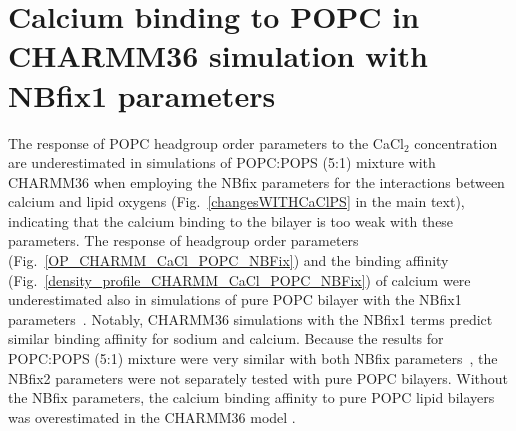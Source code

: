 \documentclass[journal=jpcbfk,manuscript=article]{achemso}
\begin{document}
\newpage

%

\clearpage
\section{Calcium binding to POPC in CHARMM36 simulation with NBfix1 parameters}\label{CHARMMcalciumNBfix}

The response of POPC headgroup order parameters to the CaCl$_2$ concentration
are underestimated in simulations of POPC:POPS (5:1) mixture with CHARMM36 when employing the
NBfix %
parameters for the interactions between calcium and lipid oxygens \cite{kim16,han2018graph}
(Fig.~\ref{changesWITHCaClPS} in the main text), indicating that the calcium binding to the
bilayer is too weak with these parameters. The response of headgroup order
parameters (Fig.~\ref{OP_CHARMM_CaCl_POPC_NBFix}) and the binding affinity
(Fig.~\ref{density_profile_CHARMM_CaCl_POPC_NBFix}) of calcium
were underestimated also in simulations of pure POPC bilayer with the NBfix1 parameters~\cite{kim16}.
Notably, CHARMM36 simulations with the NBfix1 terms \cite{venable13,kim16} predict similar binding affinity for sodium and calcium.
Because the results for POPC:POPS (5:1) mixture were very similar with both NBfix parameters~\cite{kim16,han2018graph},
the NBfix2 parameters were not separately tested with pure POPC bilayers.
Without the NBfix parameters, the calcium binding affinity to pure POPC lipid bilayers was overestimated in the CHARMM36 model \cite{catte16}.
\end{document}
